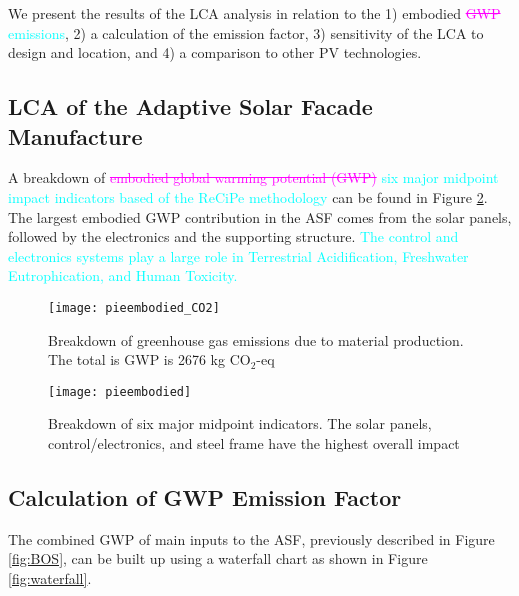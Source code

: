 
We present the results of the LCA analysis in relation to the 1) embodied \textcolor{magenta}{\sout{GWP}} \textcolor{cyan}{emissions}, 2) a calculation of the emission factor, 3) sensitivity of the LCA to design and location, and 4) a comparison to other PV technologies.

\subsection{LCA of the Adaptive Solar Facade Manufacture}

A breakdown of \textcolor{magenta}{\sout{embodied global warming potential (GWP)}} \textcolor{cyan}{six major midpoint impact indicators based of the ReCiPe methodology } can be found in Figure  \ref{fig:embodied}. The largest embodied GWP contribution in the ASF comes from the solar panels, followed by the electronics and the supporting structure. \textcolor{cyan}{The control and electronics systems play a large role in Terrestrial Acidification, Freshwater Eutrophication, and Human Toxicity.}

\begin{figure}[H]
\begin{center}
\begin{mdframed}[linecolor=magenta, linewidth=2pt]
\texttt{[image: pieembodied\_CO2]}
\caption{Breakdown of greenhouse gas emissions due to material production. The total is GWP is 2676 kg CO$_{2}$-eq}
\label{fig:embodiedold}
\end{mdframed}
\end{center}
\end{figure}

\begin{figure}[H]
\begin{center}
\begin{mdframed}[linecolor=cyan, linewidth=2pt]
\texttt{[image: pieembodied]}
\caption{Breakdown of six major midpoint indicators. The solar panels, control/electronics, and steel frame have the highest overall impact}
\label{fig:embodied}
\end{mdframed}
\end{center}
\end{figure}

\subsection{Calculation of GWP Emission Factor}
The combined GWP of main inputs to the ASF, previously described in Figure \ref{fig:BOS}, can be built up using a waterfall chart as shown in Figure \ref{fig:waterfall}. 

